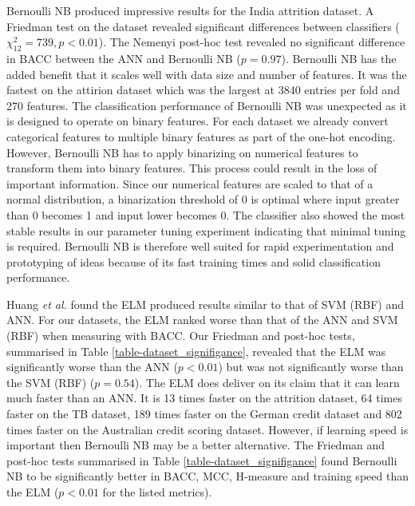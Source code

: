 \documentclass{sig-alternate-05-2015}
\begin{document}
	Bernoulli NB produced impressive results for the India attrition dataset. A Friedman test on the dataset revealed significant differences between classifiers ($\chi^2_{12}=739, p<0.01$). The Nemenyi post-hoc test revealed no significant difference in BACC between the ANN and Bernoulli NB ($p=0.97$). Bernoulli NB has the added benefit that it scales well with data size and number of features. It was the fastest on the attirion dataset which was the largest at 3840 entries per fold and 270 features. The classification performance of Bernoulli NB was unexpected as it is designed to operate on binary features. For each dataset we already convert categorical features to multiple binary features as part of the one-hot encoding. However, Bernoulli NB has to apply binarizing on numerical features to transform them into binary features. This process could result in the loss of important information. Since our numerical features are scaled to that of a normal distribution, a binarization threshold of 0 is optimal where input greater than 0 becomes 1 and input lower becomes 0. The classifier also showed the most stable results in our parameter tuning experiment indicating that minimal tuning is required. Bernoulli NB is therefore well suited for rapid experimentation and prototyping of ideas because of its fast training times and solid classification performance.

	Huang \textit{et al.} \cite{6035797, Huang2006489} found the ELM produced results similar to that of SVM (RBF) and ANN. For our datasets, the ELM ranked worse than that of the ANN and SVM (RBF) when measuring with BACC. Our Friedman and post-hoc tests, summarised in Table \ref{table-dataset_signifigance}, revealed that the ELM was significantly worse than the ANN ($p<0.01$) but was not significantly worse than the SVM (RBF) ($p=0.54$). The ELM does deliver on its claim that it can learn much faster than an ANN. It is 13 times faster on the attrition dataset, 64 times faster on the TB dataset, 189 times faster on the German credit dataset and 802 times faster on the Australian credit scoring dataset. However, if learning speed is important then Bernoulli NB may be a better alternative. The Friedman and post-hoc tests summarised in Table \ref{table-dataset_signifigance} found Bernoulli NB to be significantly better in BACC, MCC, H-measure and training speed than the ELM ($p<0.01$ for the listed metrics).
	
\end{document}
